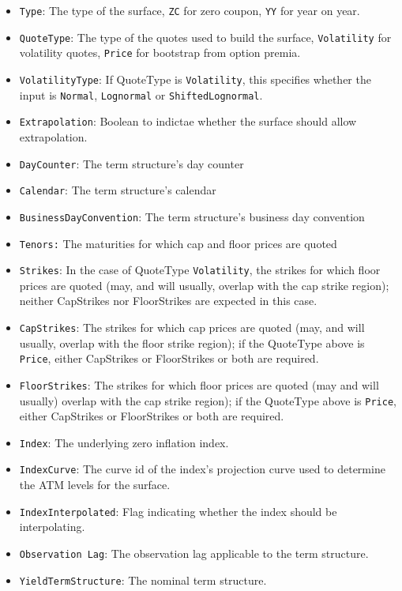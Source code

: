 \documentclass[12pt, a4paper]{article}
\begin{document}
{{\begin{itemize}
\item {\tt Type}: The type of the surface, {\tt ZC} for zero coupon, {\tt YY} for year on year. 
\item {\tt QuoteType}: The type of the quotes used to build the surface, {\tt Volatility} for volatility quotes, {\tt Price} for bootstrap from option premia. 
\item {\tt VolatilityType}: If QuoteType is {\tt Volatility}, this specifies whether the input is {\tt Normal}, {\tt Lognormal} or {\tt ShiftedLognormal}. 
\item {\tt Extrapolation}: Boolean to indictae whether the surface should allow extrapolation. 
\item {\tt DayCounter}: The term structure's day counter
\item {\tt Calendar}: The term structure's calendar 
\item {\tt BusinessDayConvention}: The term structure's business day convention
\item {\tt Tenors:} The maturities for which cap and floor prices are quoted
\item {\tt Strikes}: In the case of QuoteType {\tt Volatility}, the strikes for which floor prices are quoted (may, and will usually, overlap with the cap
  strike region); neither CapStrikes nor FloorStrikes are expected in this case. 
\item {\tt CapStrikes}: The strikes for which cap prices are quoted (may, and will usually, overlap with the floor
  strike region); if the QuoteType above is {\tt Price}, either CapStrikes or FloorStrikes or both are required.
\item {\tt FloorStrikes}: The strikes for which floor prices are quoted (may and will usually) overlap with the cap
  strike region); if the QuoteType above is {\tt Price}, either CapStrikes or FloorStrikes or both are required. 
\item {\tt Index}: The underlying zero inflation index.
\item {\tt IndexCurve}: The curve id of the index's projection curve used to determine the ATM levels for the surface.
\item {\tt IndexInterpolated}: Flag indicating whether the index should be interpolating.
\item {\tt Observation Lag}: The observation lag applicable to the term structure.
\item {\tt YieldTermStructure}: The nominal term structure.

\end{itemize}}}
\end{document}

